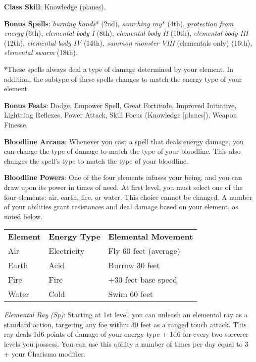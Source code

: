 \textbf{Class Skill}: Knowledge (planes).
				
\textbf{Bonus Spells}: \textit{burning hands}* (2nd), \textit{scorching ray}* (4th), \textit{protection from energy} (6th), 
\textit{elemental body I} (8th), \textit{elemental body II} (10th), \textit{elemental body III} (12th), \textit{elemental body IV} (14th),
\textit{summon monster VIII} (elementals only) (16th), \textit{elemental swarm} (18th).
				
*These spells always deal a type of damage determined by your element. In addition, the subtype of these spells changes to match
the energy type of your element.
				
\textbf{Bonus Feats}: Dodge, Empower Spell, Great Fortitude, Improved Initiative, Lightning Reflexes, Power Attack, 
Skill Focus (Knowledge \mbox{$[$}planes\mbox{$]$}), Weapon Finesse.
				
\textbf{Bloodline Arcana}: Whenever you cast a spell that deals energy damage, you can change the type of damage to match the type of 
your bloodline. This also changes the spell's type to match the type of your bloodline.
				
\textbf{Bloodline Powers}: One of the four elements infuses your being, and you can draw upon its power in times of need. At first 
level, you must select one of the four elements: air, earth, fire, or water. This choice cannot be changed. A number of your abilities 
grant resistances and deal damage based on your element, as noted below.

\begin{table}[]
\sffamily
\begin{tabular}{lll}
\textbf{Element} & \textbf{Energy Type} & \textbf{Elemental Movement} \\
Air & Electricity & Fly 60 feet (average)\\
Earth & Acid & Burrow 30 feet \\
Fire & Fire & +30 feet base speed \\
Water & Cold & Swim 60 feet \\
\end{tabular}
\end{table}
				
\textit{Elemental Ray} \textit{(Sp)}: Starting at 1st level, you can unleash an elemental ray as a standard action, targeting any foe
within 30 feet as a ranged touch attack. This ray deals 1d6 points of damage of your energy type + 1d6 for every two sorcerer levels you
possess. You can use this ability a number of times per day equal to 3 + your Charisma modifier.
				
